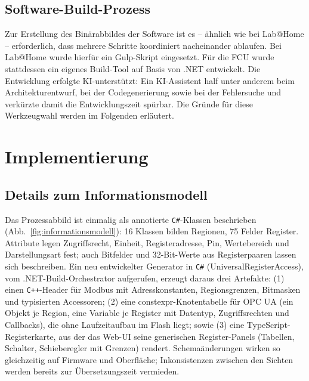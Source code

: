 \documentclass[]{article}%
\begin{document}
\subsection{Software-Build-Prozess}
Zur Erstellung des Binärabbildes der Software ist es -- ähnlich wie bei Lab@Home \cite{liebler2023} -- erforderlich, dass mehrere Schritte koordiniert nacheinander ablaufen. Bei Lab@Home wurde hierfür ein Gulp-Skript eingesetzt. Für die FCU wurde stattdessen ein eigenes Build-Tool auf Basis von .NET entwickelt.
Die Entwicklung erfolgte KI-unterstützt: Ein KI-Assistent half unter anderem beim Architekturentwurf, bei der Codegenerierung sowie bei der Fehlersuche und verkürzte damit die Entwicklungszeit spürbar. Die Gründe für diese Werkzeugwahl werden im Folgenden erläutert.

\section{Implementierung}

\subsection{Details zum Informationsmodell}
Das Prozessabbild ist einmalig als annotierte \texttt{C\#}-Klassen beschrieben (Abb.~\ref{fig:informationsmodell}): 16 Klassen bilden Regionen, 75 Felder Register. Attribute legen Zugriffsrecht, Einheit, Registeradresse, Pin, Wertebereich und Darstellungsart fest; auch Bitfelder und 32-Bit-Werte aus Registerpaaren lassen sich beschreiben. Ein neu entwickelter Generator in \texttt{C\#} (UniversalRegisterAccess), vom .NET-Build-Orchestrator aufgerufen, erzeugt daraus drei Artefakte: (1) einen \texttt{C++}-Header für Modbus mit Adresskonstanten, Regionsgrenzen, Bitmasken und typisierten Accessoren; (2) eine constexpr-Knotentabelle für OPC UA (ein Objekt je Region, eine Variable je Register mit Datentyp, Zugriffsrechten und Callbacks), die ohne Laufzeitaufbau im Flash liegt; sowie (3) eine TypeScript-Registerkarte, aus der das Web-UI seine generischen Register-Panels (Tabellen, Schalter, Schieberegler mit Grenzen) rendert. Schemaänderungen wirken so gleichzeitig auf Firmware und Oberfläche; Inkonsistenzen zwischen den Sichten werden bereits zur Übersetzungszeit vermieden.
\end{document}
